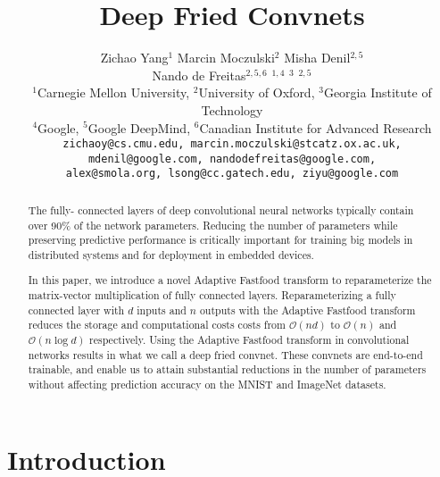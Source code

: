 \documentclass[10pt,twocolumn,letterpaper]{article}
\begin{document}
\title{Deep Fried Convnets}



\author{
  Zichao Yang$^{1}$ \quad Marcin Moczulski$^{2}$ \quad Misha Denil$^{2,5}$\\
  {Nando de Freitas}$^{2,5,6}$ $^{1,4}$ $^3$
  $^{2,5}$ \\[0.1cm]
  $^1$Carnegie Mellon University, $^2$University of Oxford, $^3$Georgia
  Institute of Technology \\ $^4$Google, $^5$Google DeepMind, $^6$Canadian Institute for Advanced Research \\
\texttt{zichaoy@cs.cmu.edu, marcin.moczulski@stcatz.ox.ac.uk,}\\
  \texttt{mdenil@google.com, nandodefreitas@google.com,}\\
  \texttt{alex@smola.org, lsong@cc.gatech.edu, ziyu@google.com} }

\maketitle

\begin{abstract}
  The fully- connected layers of deep convolutional neural networks typically
  contain over 90\% of the network parameters. Reducing the number of
  parameters while preserving predictive performance is
  critically important for training big models in distributed systems and for deployment in embedded devices.

  In this paper, we introduce a novel Adaptive Fastfood transform to reparameterize the matrix-vector multiplication of fully connected layers. Reparameterizing a fully connected layer with $d$ inputs and $n$ outputs with the Adaptive Fastfood transform reduces the storage and computational costs costs from $\mathcal{O}(nd)$ to $\mathcal{O}(n)$  and $\mathcal{O}(n\log d)$ respectively. Using the Adaptive Fastfood transform in convolutional networks results in what we call a deep fried convnet. These convnets are end-to-end trainable, and enable us to attain substantial reductions in the number of parameters without affecting prediction accuracy on the MNIST and ImageNet datasets.
\end{abstract}

\section{Introduction}
\label{sec:intro}
\end{document}
